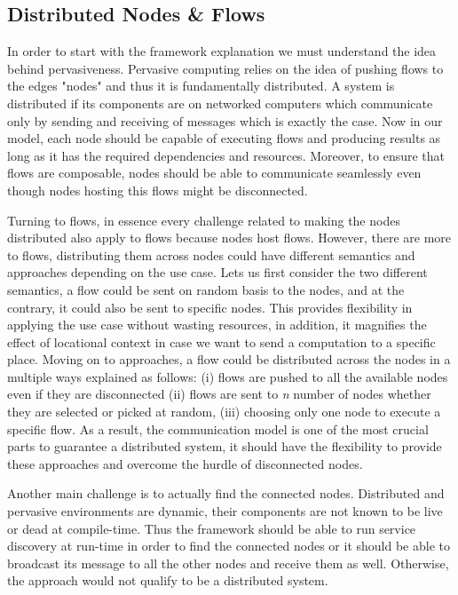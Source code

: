 \subsection{Distributed Nodes \& Flows}
In order to start with the framework explanation we must understand the idea behind pervasiveness. Pervasive computing relies on the idea of pushing flows to the edges "nodes" and thus it is fundamentally distributed. A system is distributed if its components  are on networked computers which communicate only by sending and receiving of messages \cite{DSYS} which is exactly the case. Now in our model, each node should be capable of executing flows and producing results as long as it  has the required dependencies and resources. Moreover, to ensure that flows are composable, nodes should be able to communicate seamlessly even though nodes hosting this flows might be disconnected.



Turning to flows, in essence every challenge related to making the nodes distributed also apply to flows because nodes host flows. However, there are more to flows, distributing them across nodes could have different semantics and approaches depending on the use case.
 Lets us first consider the two different semantics, a flow could be sent on random basis to the nodes, and at the contrary, it could also be sent to specific nodes. This provides flexibility in applying the use case without wasting resources, in addition, it magnifies the effect of locational context in case we want to send a computation to a specific place.
 Moving on to approaches, a flow could be distributed across the nodes in a multiple ways explained as follows: (i) flows are pushed to all the available nodes even if they are disconnected (ii) flows are sent to \textit{n} number of nodes whether they are selected or picked at random, (iii) choosing only one node to execute a specific flow. As a result, the communication model is one of the most crucial parts to guarantee a distributed system, it should have the flexibility to provide these approaches and overcome the hurdle of disconnected nodes.
 

Another main challenge is to actually find the connected nodes. Distributed and pervasive environments are dynamic, their components are not known to be live or dead at compile-time. Thus the framework should be able to run service discovery at run-time in order to find the connected nodes or it should be able to broadcast its message to all the other nodes and receive them as well. Otherwise, the approach would not qualify to be a distributed system. 






